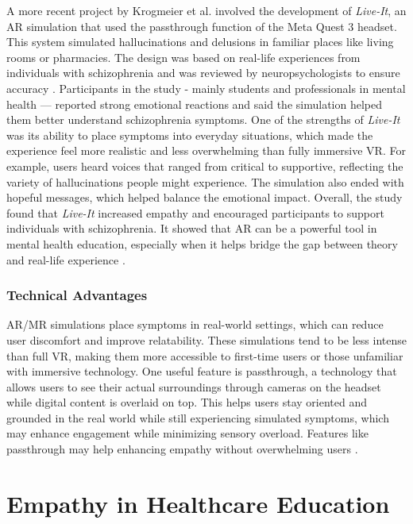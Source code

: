 A more recent project by Krogmeier et al. involved the development of \textit{Live-It}, an AR simulation that used the passthrough function of the Meta Quest 3 headset. This system simulated hallucinations and delusions in familiar places like living rooms or pharmacies. The design was based on real-life experiences from individuals with schizophrenia and was reviewed by neuropsychologists to ensure accuracy \cite{Krogmeier2024}. Participants in the study - mainly students and professionals in mental health — reported strong emotional reactions and said the simulation helped them better understand schizophrenia symptoms. One of the strengths of \textit{Live-It} was its ability to place symptoms into everyday situations, which made the experience feel more realistic and less overwhelming than fully immersive VR. For example, users heard voices that ranged from critical to supportive, reflecting the variety of hallucinations people might experience. The simulation also ended with hopeful messages, which helped balance the emotional impact. Overall, the study found that \textit{Live-It} increased empathy and encouraged participants to support individuals with schizophrenia. It showed that AR can be a powerful tool in mental health education, especially when it helps bridge the gap between theory and real-life experience \cite{Krogmeier2024}.

\subsubsection{Technical Advantages}

AR/MR simulations place symptoms in real-world settings, which can reduce user discomfort and improve relatability. These simulations tend to be less intense than full VR, making them more accessible to first-time users or those unfamiliar with immersive technology. One useful feature is passthrough, a technology that allows users to see their actual surroundings through cameras on the headset while digital content is overlaid on top. This helps users stay oriented and grounded in the real world while still experiencing simulated symptoms, which may enhance engagement while minimizing sensory overload. Features like passthrough may help enhancing empathy without overwhelming users \cite{Krogmeier2024, Silva2017, Lan2023}.

\section{Empathy in Healthcare Education}

